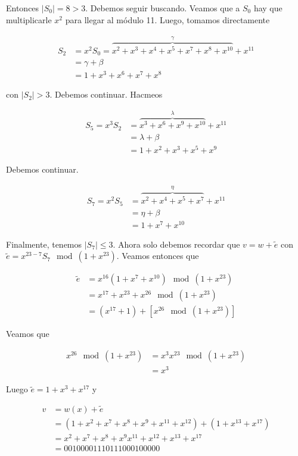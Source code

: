 \documentclass[a4paper]{article}
\begin{document}
Entonces $|S_0| = 8 > 3 $. Debemos seguir buscando. Veamos que a $S_0$ hay que
multiplicarle $x^2$ para llegar al módulo 11. Luego, tomamos directamente 

\begin{align*}
    S_2 &= x^2S_0 =  \overbrace{x^2 + x^3 + x^4 + x^5 + x^7 + x^8 + x^{10}
}^{\gamma}+ x^{11}   \\ 
&= \gamma + \beta \\ 
&= 1 + x^3 + x^6 + x^7 + x^8
\end{align*}

con $|S_2| > 3$. Debemos continuar. Hacmeos 

\begin{align*}
    S_5 = x^3S_2 &= \overbrace{x^3 + x^6 + x^9 + x^{10}}^{\lambda} + x^{11} \\
        &= \lambda + \beta \\ 
        &= 1 +x^2 + x^3 + x^5 + x^9
\end{align*}

Debemos continuar. 

\begin{align*}
    S_7 = x^2 S_5 &= \overbrace{x^2 + x^4 + x^5 + x^7}^{\eta} + x^{11} \\ 
                  &= \eta + \beta \\ 
                  &= 1 + x^7 + x^{10}
\end{align*}

Finalmente, tenemos $|S_7| \leq 3$. Ahora solo debemos recordar que $v = w +
\tilde{ e }$ con $\tilde{ e } = x^{23 - 7}S_7 \mod (1 + x^{23})$. Veamos
entonces que 

\begin{align*}
    \tilde{ e } &= x^{16}(1 + x^7 + x^{10}) \mod (1 + x^{23}) \\ 
                &= x^{17} + x^{23} + x^{26} \mod (1 + x^{23})\\ 
                &= (x^{17} + 1) + \left[ x^{26} \mod (1 + x^{23}) \right] 
\end{align*}

Veamos que 

\begin{align*}
    x^{26} \mod (1 + x^{23}) &= x^3 x^{23} \mod (1 + x^{23}) \\ 
                             &= x^3
\end{align*}

Luego $\tilde{ e } = 1 + x^{3} + x^{17}$ y 

\begin{align*}
    v &= w(x) + \tilde{ e } \\ 
      &= ( 1 + x^2 + x^7 + x^8 + x^9 + x^{11} + x^{12} ) + (1 + x^{13} + x^{17})
      \\ 
      &= x^2 + x^7 + x^8 + x^9 x^{11} + x^{12} + x^{13} + x^{17}\\ 
      &= 00100001110111000100000
\end{align*}
\end{document}
